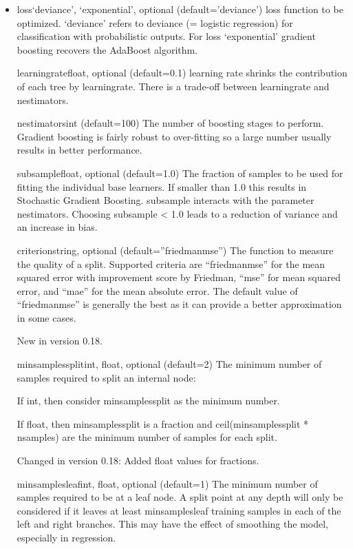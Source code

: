 \documentclass[12pt]{article}
\begin{document}
\begin{itemize}
\item
loss{‘deviance’, ‘exponential’}, optional (default=’deviance’)
loss function to be optimized. ‘deviance’ refers to deviance (= logistic regression) for classification with probabilistic outputs. For loss ‘exponential’ gradient boosting recovers the AdaBoost algorithm.

learning\textunderscore ratefloat, optional (default=0.1)
learning rate shrinks the contribution of each tree by learning\textunderscore rate. There is a trade-off between learning\textunderscore rate and n\textunderscore estimators.

n\textunderscore estimatorsint (default=100)
The number of boosting stages to perform. Gradient boosting is fairly robust to over-fitting so a large number usually results in better performance.

subsamplefloat, optional (default=1.0)
The fraction of samples to be used for fitting the individual base learners. If smaller than 1.0 this results in Stochastic Gradient Boosting. subsample interacts with the parameter n\textunderscore estimators. Choosing subsample < 1.0 leads to a reduction of variance and an increase in bias.

criterionstring, optional (default=”friedman\textunderscore mse”)
The function to measure the quality of a split. Supported criteria are “friedman\textunderscore mse” for the mean squared error with improvement score by Friedman, “mse” for mean squared error, and “mae” for the mean absolute error. The default value of “friedman\textunderscore mse” is generally the best as it can provide a better approximation in some cases.

New in version 0.18.

min\textunderscore samples\textunderscore splitint, float, optional (default=2)
The minimum number of samples required to split an internal node:

If int, then consider min\textunderscore samples\textunderscore split as the minimum number.

If float, then min\textunderscore samples\textunderscore split is a fraction and ceil(min\textunderscore samples\textunderscore split * n\textunderscore samples) are the minimum number of samples for each split.

Changed in version 0.18: Added float values for fractions.

min\textunderscore samples\textunderscore leafint, float, optional (default=1)
The minimum number of samples required to be at a leaf node. A split point at any depth will only be considered if it leaves at least min\textunderscore samples\textunderscore leaf training samples in each of the left and right branches. This may have the effect of smoothing the model, especially in regression.


\end{itemize}
\end{document}
